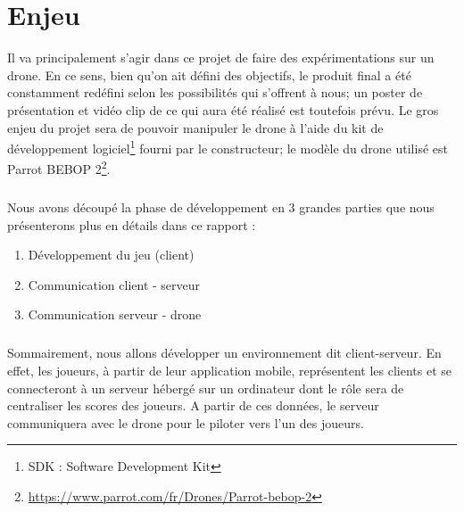 \chapter{Enjeu}
Il va principalement s'agir dans ce projet de faire des expérimentations sur un drone. En ce sens, bien qu'on ait défini des objectifs, le produit final a été constamment redéfini selon les possibilités qui s'offrent à nous; un poster de présentation et vidéo clip de ce qui aura été réalisé est toutefois prévu. Le gros enjeu du projet sera de pouvoir manipuler le drone à l'aide du kit de développement logiciel\footnote{SDK : Software Development Kit} fourni par le constructeur; le modèle du drone utilisé est Parrot BEBOP 2\footnote{\url{https://www.parrot.com/fr/Drones/Parrot-bebop-2}}.

\paragraph{}
Nous avons découpé la phase de développement en 3 grandes parties que nous présenterons plus en détails dans ce rapport :
\begin{enumerate}
\item Développement du jeu (client)
\item Communication client - serveur
\item Communication serveur - drone
\end{enumerate}

\paragraph{}
Sommairement, nous allons développer un environnement dit client-serveur. En effet, les joueurs, à partir de leur application mobile, représentent les clients et se connecteront à un serveur hébergé sur un ordinateur dont le rôle sera de centraliser les scores des joueurs. A partir de ces données, le serveur communiquera avec le drone pour le piloter vers l'un des joueurs. 
